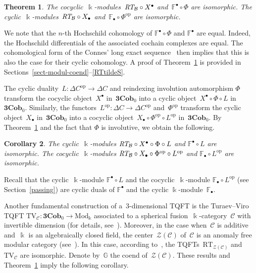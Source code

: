 \documentclass[pdftex]{sigma}
\numberwithin{equation}{section}
\newtheorem{Theorem}{Theorem}[section]
\newtheorem{Corollary}[Theorem]{Corollary}
\newcommand{\co}{\colon}
\newcommand{\Zen}[1]{\mc {Z}(#1)}
\newcommand{\mc}{\mathcal}
\newcommand{\opp}{\mathrm{op}}
\newcommand{\Mod}{\mathrm{Mod}}
\newcommand{\Cob}{\textbf{Cob}}
\newcommand{\kk}{\Bbbk}
\newcommand{\RT}{\text{RT}}
\newcommand{\TV}{\text{TV}}
\newcommand{\coend}{\mathbb{F}}
\newcommand{\coendzc}{\mathbb{G}}
\begin{document}
\begin{Theorem}\label{CYCINCOBRT}
	The cocyclic~$\kk$-modules~$\emph{\RT}_{\mc B}\circ X^\bullet$ and~$\coend^\bullet \circ \Phi$ are isomorphic.
	The cyclic~$\kk$-modules~$\emph{\RT}_{\mc B}\circ X_\bullet$ and~$\coend_\bullet \circ \Phi^\opp$ are isomorphic.
\end{Theorem}
We note that the $n$-th Hochschild cohomology of $\coend^\bullet \circ \Phi$ and $\coend^\bullet$ are equal. Indeed, the Hochschild differentials of the associated cochain complexes are equal. The cohomolo\-gical form of the Connes' long exact sequence~\cite[Proposition~9.6.11]{weibel} then implies that this is also the case for their cyclic cohomology.
A proof of Theorem~\ref{CYCINCOBRT} is provided in Sections~\ref{sect-modul-coend}--\ref{RTtildeS}.

The cyclic duality~$L\co \Delta C^{\opp}\to \Delta C$ and reindexing involution automorphism $\Phi$ transform the cocyclic object~$X^\bullet$ in~$\textbf{3}\Cob_0$ into a cyclic object~$X^\bullet \circ \Phi \circ L$ in~$\textbf{3}\Cob_0$.
Similarly, the functors~$L^\opp \co \Delta C\to \Delta C^{\opp}$ and~$\Phi^\opp$ transform the cyclic object~$X_\bullet$ in~$\textbf{3}\Cob_0$ into a cocyclic object~$X_\bullet \circ \Phi^{\opp} \circ L^\opp$ in~$\textbf{3}\Cob_0$.
By Theorem~\ref{CYCINCOBRT} and the fact that $\Phi$ is involutive, we obtain the following.

\begin{Corollary}\label{cycincobmajidsolotar}
The cyclic~$\kk$-modules $\emph{\RT}_{\mc B}\circ X^\bullet \circ \Phi \circ L$ and $\coend^\bullet \circ L$ are isomorphic.
The cocyclic~$\kk$-modules $\emph{\RT}_{\mc B}\circ X_\bullet \circ \Phi^{\opp} \circ L^\opp$ and $\coend_\bullet \circ L^\opp$ are isomorphic.
\end{Corollary}

Recall that the cyclic~$\kk$-module $\coend^\bullet \circ L$ and the cocyclic~$\kk$-module $\coend_\bullet \circ L^\opp$ (see Section~\ref{passing}) are cyclic duals of $\coend^\bullet$ and the cyclic $\kk$-module~$\coend_\bullet$.

Another fundamental construction of a~$3$-dimensional TQFT is the Turaev--Viro TQFT $\TV_{\mc C} \co \textbf{3}\Cob_0\to \Mod_\kk$ associated to a spherical fusion~$\kk$-category~$\mc C$ with invertible dimension (for details, see~\cite{moncatstft}). Moreover, in the case when~$\mc C$ is additive and~$\kk$ is an algebraically closed field, the center~$\Zen{\mc C}$ of~$\mc C$ is an anomaly free modular category (see~\cite[Theorems~5.3 and~5.4]{moncatstft}).
In this case, according to~\cite[Theorem~17.1]{moncatstft}, the TQFTs~$\RT_{\Zen{\mc C}}$ and~$\TV_{\mc C}$ are isomorphic.
Denote by~$\coendzc$ the coend of~$\Zen{\mc C}$.
These results and Theorem~\ref{CYCINCOBRT} imply the following corollary.
\end{document}
